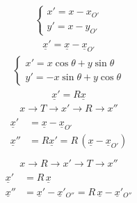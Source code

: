 \documentclass[letterpaper,10pt,italian]{jupyterBook}
\begin{document}
\sphinxAtStartPar
{}
\begin{equation*}
\begin{split}\begin{cases}
  x' = x - x_{O'} \\
  y' = x - y_{O'}
\end{cases}\end{split}
\end{equation*}\begin{equation*}
\begin{split}\underline{x}' = \underline{x} - \underline{x}_{O'}\end{split}
\end{equation*}
\sphinxAtStartPar
{}
\begin{equation*}
\begin{split}\begin{cases}
  x' = x \cos \theta + y \sin \theta \\
  y' =-x \sin \theta + y \cos \theta
\end{cases}\end{split}
\end{equation*}\begin{equation*}
\begin{split}\underline{x}' = R \underline{x}\end{split}
\end{equation*}
\sphinxAtStartPar
{}
\begin{equation*}
\begin{split} x \rightarrow T \rightarrow x' \rightarrow R \rightarrow x''\end{split}
\end{equation*}\begin{equation*}
\begin{split}\begin{aligned}
\underline{x}' & = \underline{x} - \underline{x}_{O'} \\
\underline{x}'' & = R \underline{x}' = R \, (\underline{x} - \underline{x}_{O'}) \\
\end{aligned}\end{split}
\end{equation*}\begin{equation*}
\begin{split} x \rightarrow R \rightarrow x' \rightarrow T \rightarrow x''\end{split}
\end{equation*}\begin{equation*}
\begin{split}\begin{aligned}
\underline{x}'  & = R \, \underline{x}  \\
\underline{x}'' & = \underline{x}' - \underline{x}'_{O''} = R \, \underline{x} - \underline{x}'_{O''} \\ 
\end{aligned}\end{split}
\end{equation*}
\end{document}
